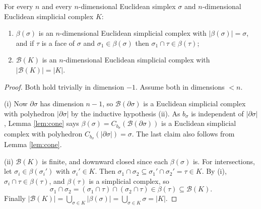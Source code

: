 \documentclass[a4paper]{scrartcl}
\newcommand{\bary}{\mathcal{B}}
\begin{document}
\begin{theorem} \label{thm:subdivision}
	For every $n$ and every $n$-dimensional Euclidean simplex $\sigma$ and $n$-dimensional Euclidean simplicial complex $K$:
	\begin{enumerate}
		\item $\beta(\sigma)$ is an $n$-dimensional Euclidean simplicial complex with $|\beta(\sigma)| = \sigma$, and if $\tau$ is a face of $\sigma$ and $\sigma_1 \in \beta(\sigma)$ then $\sigma_1 \cap \tau \in \beta(\tau)$;
		\item $\bary(K)$ is an $n$-dimensional Euclidean simplicial complex with $|\bary(K)| = |K|$.
	\end{enumerate}
\end{theorem}
\begin{proof}
	Both hold trivially in dimension $-1$. Assume both in dimensions $< n$.

	(i) Now $\partial\sigma$ has dimension $n-1$, so $\bary(\partial\sigma)$ is a Euclidean simplicial complex with polyhedron $|\partial\sigma|$ by the inductive hypothesis (ii). As $b_\sigma$ is independent of $|\partial\sigma|$, Lemma \ref{lem:cone} says $\beta(\sigma) = C_{b_\sigma}(\bary(\partial\sigma))$ is a Euclidean simplicial complex with polyhedron $C_{b_\sigma}(|\partial\sigma|) = \sigma$. The last claim also follows from Lemma \ref{lem:cone}.

	(ii) $\bary(K)$ is finite, and downward closed since each $\beta(\sigma)$ is. For intersections, let $\sigma_i \in \beta(\sigma_i')$ with $\sigma_i' \in K$. Then $\sigma_1 \cap \sigma_2 \subseteq \sigma_1' \cap \sigma_2' = \tau \in K$. By (i), $\sigma_i \cap \tau \in \beta(\tau)$, and $\beta(\tau)$ is a simplicial complex, so
	$$
	\sigma_1\cap\sigma_2 = (\sigma_1\cap\tau)\cap(\sigma_2\cap\tau) \in \beta(\tau) \subseteq \bary(K).
	$$
	Finally $|\bary(K)| = \bigcup_{\sigma\in K}|\beta(\sigma)| = \bigcup_{\sigma\in K}\sigma = |K|$.
\end{proof}
\end{document}
